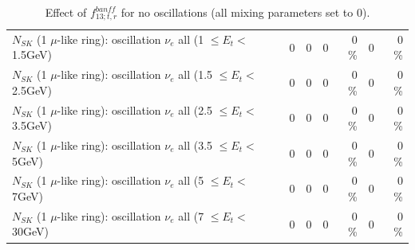 \begin{table}
\begin{tabular}{| l | r | r | r  r | r  r |}
$N_{SK}$ (1 $\mu$-like ring): oscillation $\nu_{e}$ all (1 $\leq E_{t} <$ 1.5GeV) &               0 &               0 &               0 &        0 \%  &               0 &        0 \%  \\ 
$N_{SK}$ (1 $\mu$-like ring): oscillation $\nu_{e}$ all (1.5 $\leq E_{t} <$ 2.5GeV) &               0 &               0 &               0 &        0 \%  &               0 &        0 \%  \\ 
$N_{SK}$ (1 $\mu$-like ring): oscillation $\nu_{e}$ all (2.5 $\leq E_{t} <$ 3.5GeV) &               0 &               0 &               0 &        0 \%  &               0 &        0 \%  \\ 
$N_{SK}$ (1 $\mu$-like ring): oscillation $\nu_{e}$ all (3.5 $\leq E_{t} <$ 5GeV) &               0 &               0 &               0 &        0 \%  &               0 &        0 \%  \\ 
 $N_{SK}$ (1 $\mu$-like ring): oscillation $\nu_{e}$ all (5 $\leq E_{t} <$ 7GeV) &               0 &               0 &               0 &        0 \%  &               0 &        0 \%  \\ 
$N_{SK}$ (1 $\mu$-like ring): oscillation $\nu_{e}$ all (7 $\leq E_{t} <$ 30GeV) &               0 &               0 &               0 &        0 \%  &               0 &        0 \%  \\ 
\hline
\hline
\end{tabular}
\caption{ Effect of $f_{13; t, r}^{banff}$ for no oscillations (all mixing parameters set to 0). }
\label{tab:num_banff_13_1RmuT_3f_osc_t13:0}
\end{table}
\clearpage
